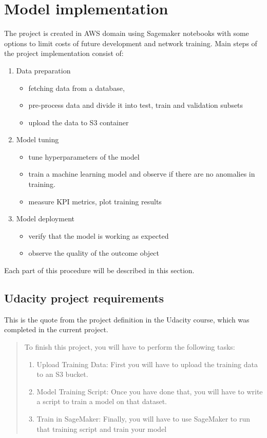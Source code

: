 \documentclass{article}
\begin{document}
\section{Model implementation}
The project is created in AWS domain using Sagemaker notebooks with some options to limit costs of future development and network training. 
Main steps of the project implementation consist of:
\begin{enumerate}
	\item Data preparation
	\begin{itemize}
		\item fetching data from a database, 
		\item pre-process data and divide it into test, train and validation subsets
		\item upload the data to S3 container
	\end{itemize}	
	\item Model tuning
	\begin{itemize}
		\item tune hyperparameters of the model
		\item train a machine learning model and observe if there are no anomalies in training.
		\item measure KPI metrics, plot training results
	\end{itemize}	
	\item Model deployment
	\begin{itemize}
		\item verify that the model is working as expected
		\item observe the quality of the outcome object
	\end{itemize}
\end{enumerate}
Each part of this procedure will be described in this section.

\subsection{Udacity project requirements}
This is the quote from the project definition in the Udacity course, which was completed in the current project.
\begin{quote}
	To finish this project, you will have to perform the following tasks:
	\begin{enumerate}
		\item Upload Training Data: First you will have to upload the training data to an S3 bucket.
		\item Model Training Script: Once you have done that, you will have to write a script to train a model on that dataset.
		\item Train in SageMaker: Finally, you will have to use SageMaker to run that training script and train your model
	\end{enumerate}
\end{quote}
\end{document}
